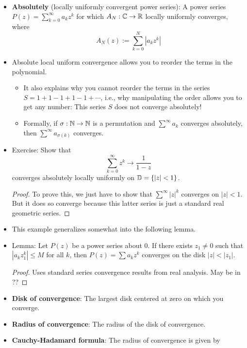 \documentclass[../notes.tex]{subfiles}
\begin{document}
\begin{itemize}
\begin{itemize}
    \end{itemize}
    \item \textbf{Absolutely} (locally uniformly convergent power series): A power series $P(z)=\sum_{k=0}^\infty a_kz^k$ for which $A_N:\mathbb{C}\to\mathbb{R}$ locally uniformly converges, where
    \begin{equation*}
        A_N(z) := \sum_{k=0}^N|a_kz^k|
    \end{equation*}
    \item Absolute local uniform convergence allows you to reorder the terms in the polynomial.
    \begin{itemize}
        \item It also explains why you cannot reorder the terms in the series $S=1+1-1+1-1+\cdots$, i.e., why manipulating the order allows you to get any number: This series $S$ does not converge absolutely!
        \item Formally, if $\sigma:\mathbb{N}\to\mathbb{N}$ is a permutation and $\sum^\infty a_k$ converges absolutely, then $\sum^\infty a_{\sigma(k)}$ converges.
    \end{itemize}
    \item Exercise: Show that
    \begin{equation*}
        \sum_{k=0}^\infty z^k \to \frac{1}{1-z}
    \end{equation*}
    converges absolutely locally uniformly on $\mathbb{D}=\{|z|<1\}$.
    \begin{proof}
        To prove this, we just have to show that $\sum^\infty|z|^k$ converges on $|z|<1$. But it does so converge because this latter series is just a standard real geometric series.
    \end{proof}
    \item This example generalizes somewhat into the following lemma.
    \item Lemma: Let $P(z)$ be a power series about 0. If there exists $z_1\neq 0$ such that $|a_kz_1^k|\leq M$ for all $k$, then $P(z)=\sum a_kz^k$ converges on the disk $|z|<|z_1|$.
    \begin{proof}
        Uses standard series convergence results from real analysis. May be in \textcite{bib:FischerLieb}??
    \end{proof}
    \item \textbf{Disk of convergence}: The largest disk centered at zero on which you converge.
    \item \textbf{Radius of convergence}: The radius of the disk of convergence.
    \item \textbf{Cauchy-Hadamard formula}: The radius of convergence is given by

\end{itemize}
\end{document}
